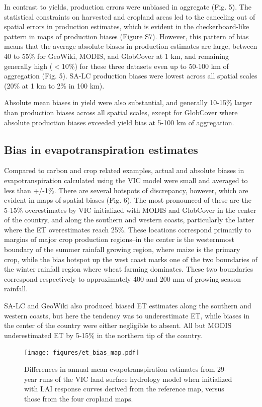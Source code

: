 \documentclass{pnastwo}
\begin{document}
\begin{article}
In contrast to yields, production errors were unbiased in aggregate (Fig. 5). The statistical constraints on harvested and cropland areas led to the canceling out of spatial errors in production estimates, which is evident in the checkerboard-like pattern in maps of production biases (Figure S7). However, this pattern of bias means that the average absolute biases in  production estimates are large, between 40 to 55\% for GeoWiki, MODIS, and GlobCover at 1 km, and remaining generally high ($<$10\%) for these three datasets even up to 50-100 km of aggregation (Fig. 5). SA-LC production biases were lowest across all spatial scales (20\% at 1 km to 2\% in 100 km).  

Absolute mean biases in yield were also substantial, and generally 10-15\% larger than production biases across all spatial scales, except for GlobCover where absolute production biases exceeded yield bias at 5-100 km of aggregation. 

\subsection{Bias in evapotranspiration estimates}
Compared to carbon and crop related examples, actual and absolute biases in evapotranspiration calculated using the VIC model were small and averaged to less than +/-1\%.  There are several hotspots of discrepancy, however, which are evident in maps of spatial biases (Fig. 6). The most pronounced of these are the 5-15\% overestimates by VIC initialized with MODIS and GlobCover in the center of the country, and along the southern and western coasts, particularly the latter where the ET overestimates reach 25\%. These locations correspond primarily to margins of major crop production regions--in the center is the westernmost boundary of the summer rainfall growing region, where maize is the primary crop, while the bias hotspot up the west coast marks one of the two boundaries of the winter rainfall region where wheat farming dominates\cite{hardy_rainfed_2011}. These two boundaries correspond respectively to approximately 400 and 200 mm of growing season rainfall. 

SA-LC and GeoWiki also produced biased ET estimates along the southern and western coasts, but here the tendency was to underestimate ET, while biases in the center of the country were either negligible to absent.  All but MODIS underestimated ET by 5-15\% in the northern tip of the country.  

\FloatBarrier
\begin{figure}[!ht]
\centerline{\texttt{[image: figures/et\_bias\_map.pdf]}}
\caption{Differences in annual mean evapotranspiration estimates from 29-year runs of the VIC land surface hydrology model when initialized with LAI response curves derived from the reference map, versus those from the four cropland maps.}\label{afoto}
\end{figure}


\end{article}
\end{document}
